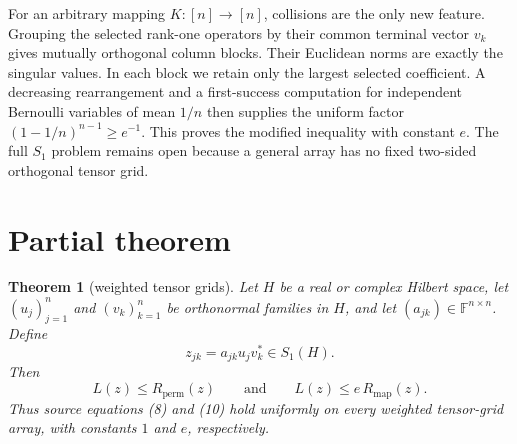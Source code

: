 \documentclass[11pt]{article}
\newtheorem{theorem}{Theorem}
\newcommand{\Sone}{S_1}
\begin{document}
For an arbitrary mapping $K:[n]\to[n]$, collisions are the only new feature.  Grouping the selected rank-one operators by their common terminal vector $v_k$ gives mutually orthogonal column blocks.  Their Euclidean norms are exactly the singular values.  In each block we retain only the largest selected coefficient.  A decreasing rearrangement and a first-success computation for independent Bernoulli variables of mean $1/n$ then supplies the uniform factor $(1-1/n)^{n-1}\ge e^{-1}$.  This proves the modified inequality with constant $e$.  The full $\Sone$ problem remains open because a general array has no fixed two-sided orthogonal tensor grid.

\section{Partial theorem}

\begin{theorem}[weighted tensor grids]
Let $H$ be a real or complex Hilbert space, let $(u_j)_{j=1}^n$ and $(v_k)_{k=1}^n$ be orthonormal families in $H$, and let $(a_{jk})\in\mathbb F^{n\times n}$.  Define
\[
 z_{jk}=a_{jk}u_jv_k^*\in \Sone(H).
\]
Then
\[
 L(z)\le R_{\mathrm{perm}}(z)
 \qquad\text{and}\qquad
 L(z)\le e\,R_{\mathrm{map}}(z).
\]
Thus source equations (8) and (10) hold uniformly on every weighted tensor-grid array, with constants $1$ and $e$, respectively.
\end{theorem}
\end{document}
